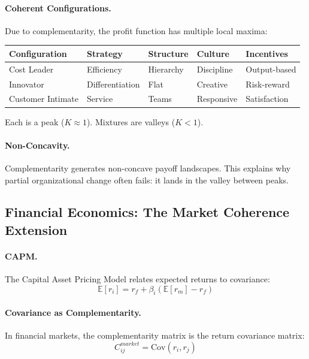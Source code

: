 \paragraph{Coherent Configurations.}
Due to complementarity, the profit function has multiple local maxima:
\begin{center}
\renewcommand{\arraystretch}{1.2}
\begin{tabular}{lllll}
\hline
\textbf{Configuration} & \textbf{Strategy} & \textbf{Structure} & \textbf{Culture} & \textbf{Incentives} \\
\hline
Cost Leader & Efficiency & Hierarchy & Discipline & Output-based \\
Innovator & Differentiation & Flat & Creative & Risk-reward \\
Customer Intimate & Service & Teams & Responsive & Satisfaction \\
\hline
\end{tabular}
\end{center}

Each is a peak ($K \approx 1$). Mixtures are valleys ($K < 1$).

\paragraph{Non-Concavity.}
Complementarity generates non-concave payoff landscapes.
This explains why partial organizational change often fails:
it lands in the valley between peaks.

\subsection{Financial Economics: The Market Coherence Extension}

\paragraph{CAPM.}
The Capital Asset Pricing Model relates expected returns to covariance:
\begin{equation}
  \mathbb{E}[r_i] = r_f + \beta_i (\mathbb{E}[r_m] - r_f)
\end{equation}

\paragraph{Covariance as Complementarity.}
In financial markets, the complementarity matrix is the return covariance matrix:
\begin{equation}
  C^{market}_{ij} = \text{Cov}(r_i, r_j)
\end{equation}

